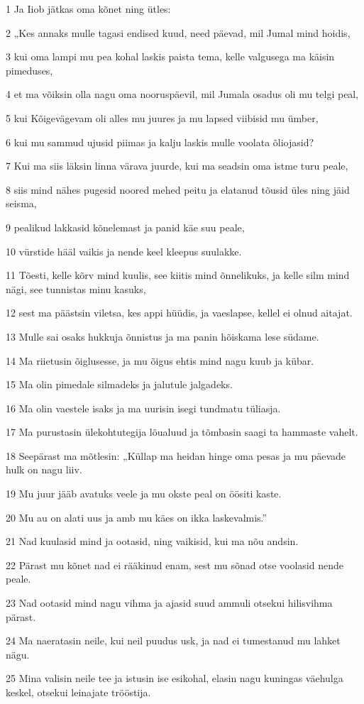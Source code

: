 \par 1 Ja Iiob jätkas oma kõnet ning ütles:
\par 2 „Kes annaks mulle tagasi endised kuud, need päevad, mil Jumal mind hoidis,
\par 3 kui oma lampi mu pea kohal laskis paista tema, kelle valgusega ma käisin pimeduses,
\par 4 et ma võiksin olla nagu oma nooruspäevil, mil Jumala osadus oli mu telgi peal,
\par 5 kui Kõigevägevam oli alles mu juures ja mu lapsed viibisid mu ümber,
\par 6 kui mu sammud ujusid piimas ja kalju laskis mulle voolata õliojasid?
\par 7 Kui ma siis läksin linna värava juurde, kui ma seadsin oma istme turu peale,
\par 8 siis mind nähes pugesid noored mehed peitu ja elatanud tõusid üles ning jäid seisma,
\par 9 pealikud lakkasid kõnelemast ja panid käe suu peale,
\par 10 vürstide hääl vaikis ja nende keel kleepus suulakke.
\par 11 Tõesti, kelle kõrv mind kuulis, see kiitis mind õnnelikuks, ja kelle silm mind nägi, see tunnistas minu kasuks,
\par 12 sest ma päästsin viletsa, kes appi hüüdis, ja vaeslapse, kellel ei olnud aitajat.
\par 13 Mulle sai osaks hukkuja õnnistus ja ma panin hõiskama lese südame.
\par 14 Ma riietusin õiglusesse, ja mu õigus ehtis mind nagu kuub ja kübar.
\par 15 Ma olin pimedale silmadeks ja jalutule jalgadeks.
\par 16 Ma olin vaestele isaks ja ma uurisin isegi tundmatu tüliasja.
\par 17 Ma purustasin ülekohtutegija lõualuud ja tõmbasin saagi ta hammaste vahelt.
\par 18 Seepärast ma mõtlesin: „Küllap ma heidan hinge oma pesas ja mu päevade hulk on nagu liiv.
\par 19 Mu juur jääb avatuks veele ja mu okste peal on öösiti kaste.
\par 20 Mu au on alati uus ja amb mu käes on ikka laskevalmis.”
\par 21 Nad kuulasid mind ja ootasid, ning vaikisid, kui ma nõu andsin.
\par 22 Pärast mu kõnet nad ei rääkinud enam, sest mu sõnad otse voolasid nende peale.
\par 23 Nad ootasid mind nagu vihma ja ajasid suud ammuli otsekui hilisvihma pärast.
\par 24 Ma naeratasin neile, kui neil puudus usk, ja nad ei tumestanud mu lahket nägu.
\par 25 Mina valisin neile tee ja istusin ise esikohal, elasin nagu kuningas väehulga keskel, otsekui leinajate trööstija.

